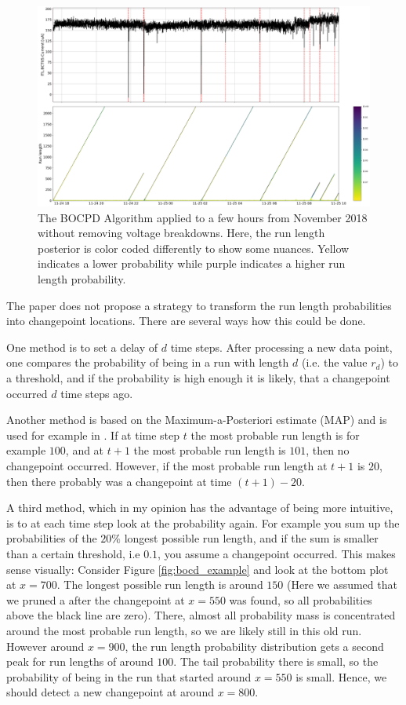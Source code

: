 \documentclass[12pt,a4paper]{article}
\begin{document}
\begin{figure}
	\centering
	\includegraphics{images/Nov2018_study.png}
	\caption{The BOCPD Algorithm applied to a few hours from November 2018 without removing voltage breakdowns. Here, the run length posterior is color coded differently to show some nuances. Yellow indicates a lower probability while purple indicates a higher run length probability.}
	\label{fig:bocd_example_2}
\end{figure}

The paper \cite{Adams:BayesianOnlineChangepoint} does not propose a strategy to transform the run length probabilities into changepoint locations. There are several ways how this could be done.

One method is to set a delay of $d$ time steps. After processing a new data point, one compares the probability of being in a run with length $d$ (i.e. the value $r_d$) to a threshold, and if the probability is high enough it is likely, that a changepoint occurred $d$ time steps ago.

Another method is based on the Maximum-a-Posteriori estimate (MAP)  and is used for example in \cite{Knoblauch:SpatiotemporalBayesian}. If at time step $t$ the most probable run length is for example $100$, and at $t+1$ the most probable run length is $101$, then no changepoint occurred. However, if the most probable run length at $t+1$ is $20$, then there probably was a changepoint at time $(t+1)-20$.

A third method, which in my opinion has the advantage of being more intuitive, is to at each time step look at the probability again. For example you sum up the probabilities of the $20\%$ longest possible run length, and if the sum is smaller than a certain threshold, i.e $0.1$, you assume a changepoint occurred. This makes sense visually: Consider Figure \ref{fig:bocd_example} and look at the bottom plot at $x=700$. The longest possible run length is around $150$ (Here we assumed that we pruned a after the changepoint at $x=550$ was found, so all probabilities above the black line are zero). There, almost all probability mass is concentrated around the most probable run length, so we are likely still in this old run. However around $x=900$, the run length probability distribution gets a second peak for run lengths of around $100$. The tail probability there is small, so the probability of being in the run that started around $x=550$ is small. Hence, we should detect a new changepoint at around $x=800$.
\end{document}
